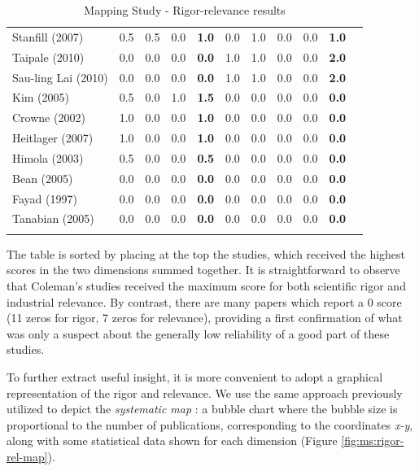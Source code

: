\documentclass[final,5p,times,twocolumn]{elsarticle}
\begin{document}
\begin{longtable}{|l|ccc|c|cccc|c|c|}
Stanfill (2007) & 0.5   & 0.5   & 0.0   & \textbf{1.0} & 0.0   & 1.0   & 0.0   & 0.0   & \textbf{1.0} & \cite{Stanfill2007} \\
Taipale (2010) & 0.0   & 0.0   & 0.0   & \textbf{0.0} & 1.0   & 1.0   & 0.0   & 0.0   & \textbf{2.0} & \cite{Taipale2010} \\
Sau-ling Lai (2010) & 0.0   & 0.0   & 0.0   & \textbf{0.0} & 1.0   & 1.0   & 0.0   & 0.0   & \textbf{2.0} & \cite{Lai2010} \\
Kim (2005) & 0.5   & 0.0   & 1.0   & \textbf{1.5} & 0.0   & 0.0   & 0.0   & 0.0   & \textbf{0.0} & \cite{Kim2005} \\
Crowne (2002) & 1.0   & 0.0   & 0.0   & \textbf{1.0} & 0.0   & 0.0   & 0.0   & 0.0   & \textbf{0.0} & \cite{Crowne2002} \\
Heitlager (2007) & 1.0   & 0.0   & 0.0   & \textbf{1.0} & 0.0   & 0.0   & 0.0   & 0.0   & \textbf{0.0} & \cite{Heitlager2007} \\
Himola (2003) & 0.5   & 0.0   & 0.0   & \textbf{0.5} & 0.0   & 0.0   & 0.0   & 0.0   & \textbf{0.0} & \cite{Hilmola2003} \\
Bean (2005) & 0.0   & 0.0   & 0.0   & \textbf{0.0} & 0.0   & 0.0   & 0.0   & 0.0   & \textbf{0.0} & \cite{Bean2005} \\
Fayad (1997) & 0.0   & 0.0   & 0.0   & \textbf{0.0} & 0.0   & 0.0   & 0.0   & 0.0   & \textbf{0.0} & \cite{Fayad1997} \\
Tanabian (2005) & 0.0   & 0.0   & 0.0   & \textbf{0.0} & 0.0   & 0.0   & 0.0   & 0.0   & \textbf{0.0} & \cite{Tanabian2005} \\

\hline \hline
\caption{Mapping Study - Rigor-relevance results }\label{tab:ms:rig-rel-results}\\
 \end{longtable}

\small
\twocolumn


The table is sorted by placing at the top the studies, which received the highest scores in the two dimensions summed together. It is straightforward to observe that Coleman’s studies received the maximum score for both scientific rigor and industrial relevance. By contrast, there are many papers which report a $0$ score (11 zeros for rigor, 7 zeros for relevance), providing a first confirmation of what was only a suspect about the generally low reliability of a good part of these studies.

To further extract useful insight, it is more convenient to adopt a graphical representation of the rigor and relevance. We use the same approach previously utilized to depict the \textit{systematic map} : a bubble chart where the bubble size is proportional to the number of publications, corresponding to the coordinates \textit{x-y}, along with some statistical data shown for each dimension (Figure \ref{fig:ms:rigor-rel-map}).
\end{document}
